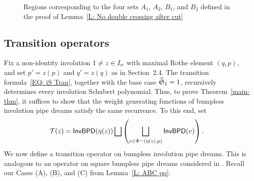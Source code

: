 \documentclass[10pt]{article}
\begin{document}
\begin{figure}
    \centering
    \caption{Regions corresponding to the four sets $A_1$, $A_2$, $B_1$, and $B_2$ defined in the proof of Lemma~\ref{L: No double crossing after cut}}
    \label{F: (proof) two pipes}
\end{figure}
\subsection{Transition operators}
\label{SS: transition on InvBPD}

Fix a non-identity involution $1\neq z\in I_n$
with maximal Rothe element $(q,p)$,
and set $p'=z(p)$ and $q'=z(q)$ as in Section~2.4.
The transition formula~\eqref{EQ: iS Tran},
together with the base case $\widehat{\mathfrak S}_1=1$,
recursively determines every involution Schubert polynomial.
Thus, to prove Theorem~\ref{main-thm},
it suffices to show that the weight generating functions
of bumpless involution pipe dreams satisfy the same recurrence.
To this end, 
set
\[
\mathcal{T}(z)
=
\mathsf{InvBPD}(\eta(z))
\bigsqcup
\left(
\bigsqcup_{v\in\hat\Phi^{-}(\eta(z),p)}
\mathsf{InvBPD}(v)
\right).
\]
We now define a transition operator on bumpless involution pipe dreams. This is 
analogous to an operator on square bumpless pipe dreams 
considered in \cite{Weigandt}. 
Recall our Cases (A), (B), and (C) from Lemma~\ref{L: ABC pq}.
\end{document}
